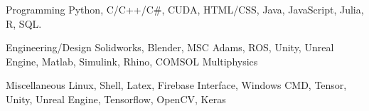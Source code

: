 

\begin{cvskills}

  \cvskill
    {Programming} %
    {Python, C/C++/C\#, CUDA, HTML/CSS, Java, JavaScript, Julia, R, SQL.} %

\cvskill
{Engineering/Design} %
{Solidworks, Blender, MSC Adams, ROS, Unity, Unreal Engine, Matlab, Simulink, Rhino, COMSOL Multiphysics} %

  \cvskill
    {Miscellaneous} %
    {Linux, Shell, Latex, Firebase Interface, Windows CMD, Tensor, Unity, Unreal Engine, Tensorflow, OpenCV, Keras} %
   


\end{cvskills}
